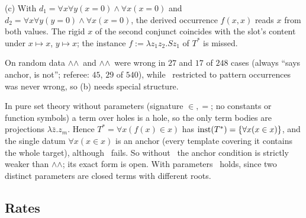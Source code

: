 (c) With $d_1=\forall x\forall y(x=0)\wedge\forall x(x=0)$ and $d_2=\forall x\forall y(y=0)\wedge\forall x(x=0)$, the derived occurrence $f(x,x)$ reads $x$ from both values. The rigid $x$ of the second conjunct coincides with the slot's content under $x\mapsto x$, $y\mapsto x$; the instance $f:=\lambda z_1z_2.Sz_1$ of $T^*$ is missed.

On random data \evR$\wedge$\evN$\wedge$\evD\ and \evRs$\wedge$\evN$\wedge$\evD\ were wrong in $27$ and $17$ of $248$ cases (always ``says anchor, is not''; referee: $45$, $29$ of $540$), while \evU\ restricted to pattern occurrences was never wrong, so (b) needs special structure.

\begin{example}\label{ex:single:rich}
In pure set theory without parameters (signature $\in,=$; no constants or function symbols) a term over holes is a hole, so the only term bodies are projections $\lambda\bar z.z_m$. Hence $T^*=\forall x(f(x)\in x)$ has $\mathrm{inst}(T^*)=\{\forall x(x\in x)\}$, and the single datum $\forall x(x\in x)$ is an anchor (every template covering it contains the whole target), although \evRs\ fails. So without \Rich\ the anchor condition is strictly weaker than \evRs$\wedge$\evN$\wedge$\evU; its exact form is open. With parameters \Rich\ holds, since two distinct parameters are closed terms with different roots.
\end{example}

\subsection{Rates}\label{app:single:rates}

